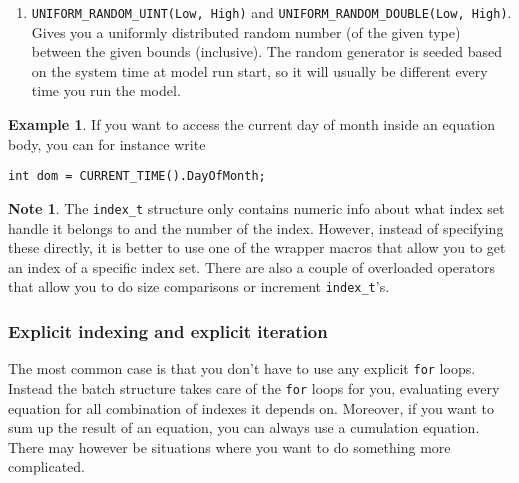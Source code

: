 \documentclass[11pt]{article}
\theoremstyle{definition}
\newtheorem{mynote}{Note}
\newenvironment{note}%
  {\begin{lrbox}{\notebox}%
   \begin{minipage}{\dimexpr\linewidth-2\fboxsep}
   \begin{mynote}}%
  {\end{mynote}%
   \end{minipage}%
   \end{lrbox}%
   \begin{trivlist}
     \item[]\colorbox{silver}{\usebox\notebox}
   \end{trivlist}}
\newtheorem{myexample}{Example}
\newenvironment{example}%
  {\begin{lrbox}{\examplebox}%
   \begin{minipage}{\dimexpr\linewidth-2\fboxsep}
   \begin{myexample}}%
  {\end{myexample}%
   \end{minipage}%
   \end{lrbox}%
   \begin{trivlist}
     \item[]\colorbox{silver}{\usebox\examplebox}
   \end{trivlist}}
\begin{document}
\begin{enumerate}[i]
\begin{enumerate}[1]
	\item {\tt DayOfMonth}. What day in the month the current timestep starts. Starts at 1.
	\item {\tt SecondOfDay}. What second of the day the current timestep starts. Range: 0-86399.
	\item {\tt DaysThisYear}. The number of days in the year that the current timestep starts in.
	\item {\tt DaysThisMonth}. The number of days in the month that the current timestep starts in.
	\item {\tt StepLengthInSeconds}. The number of seconds that the current timestep spans.
	\end{enumerate}
Some of these are more relevant than others, depending on the timestep size of the model. See section \ref{sec:timestepsize}.
\item {\tt UNIFORM\_RANDOM\_UINT(Low, High)} and {\tt UNIFORM\_RANDOM\_DOUBLE(Low, High)}. Gives you a uniformly distributed random number (of the given type) between the given bounds (inclusive). The random generator is seeded based on the system time at model run start, so it will usually be different every time you run the model.
\end{enumerate}

\begin{example}
If you want to access the current day of month inside an equation body, you can for instance write
\begin{lstlisting}[style=mycpp]
int dom = CURRENT_TIME().DayOfMonth;
\end{lstlisting}
\end{example}

\begin{note}
The {\tt index\_t} structure only contains numeric info about what index set handle it belongs to and the number of the index. However, instead of specifying these directly, it is better to use one of the wrapper macros that allow you to get an index of a specific index set. There are also a couple of overloaded operators that allow you to do size comparisons or increment {\tt index\_t}'s.
\end{note}

\subsubsection{Explicit indexing and explicit iteration}

The most common case is that you don't have to use any explicit {\tt for} loops. Instead the batch structure takes care of the {\tt for} loops for you, evaluating every equation for all combination of indexes it depends on. Moreover, if you want to sum up the result of an equation, you can always use a cumulation equation. There may however be situations where you want to do something more complicated.
\end{document}
